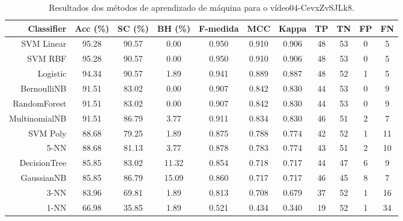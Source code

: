 \begin{table}[!htb]
\centering
\caption{Resultados dos métodos de aprendizado de máquina para o vídeo04-CevxZvSJLk8.}
\label{tab:04-CevxZvSJLk8}
\begin{tabular}{r|c|c|c|c|c|c|c|c|c|c}
\hline\hline
Classifier & Acc (\%) & SC (\%) & BH (\%) & F-medida & MCC & Kappa & TP & TN & FP & FN \\ \hline
SVM Linear & 95.28 & 90.57 & 0.00 & 0.950 & 0.910 & 0.906 & 48 & 53 & 0 & 5 \\ 
SVM RBF & 95.28 & 90.57 & 0.00 & 0.950 & 0.910 & 0.906 & 48 & 53 & 0 & 5 \\ 
Logistic & 94.34 & 90.57 & 1.89 & 0.941 & 0.889 & 0.887 & 48 & 52 & 1 & 5 \\ 
BernoulliNB & 91.51 & 83.02 & 0.00 & 0.907 & 0.842 & 0.830 & 44 & 53 & 0 & 9 \\ 
RandomForest & 91.51 & 83.02 & 0.00 & 0.907 & 0.842 & 0.830 & 44 & 53 & 0 & 9 \\ 
MultinomialNB & 91.51 & 86.79 & 3.77 & 0.911 & 0.834 & 0.830 & 46 & 51 & 2 & 7 \\ 
SVM Poly & 88.68 & 79.25 & 1.89 & 0.875 & 0.788 & 0.774 & 42 & 52 & 1 & 11 \\ 
5-NN & 88.68 & 81.13 & 3.77 & 0.878 & 0.783 & 0.774 & 43 & 51 & 2 & 10 \\ 
DecisionTree & 85.85 & 83.02 & 11.32 & 0.854 & 0.718 & 0.717 & 44 & 47 & 6 & 9 \\ 
GaussianNB & 85.85 & 86.79 & 15.09 & 0.860 & 0.717 & 0.717 & 46 & 45 & 8 & 7 \\ 
3-NN & 83.96 & 69.81 & 1.89 & 0.813 & 0.708 & 0.679 & 37 & 52 & 1 & 16 \\ 
1-NN & 66.98 & 35.85 & 1.89 & 0.521 & 0.434 & 0.340 & 19 & 52 & 1 & 34 \\ 
\hline\hline
\end{tabular}
\end{table}
